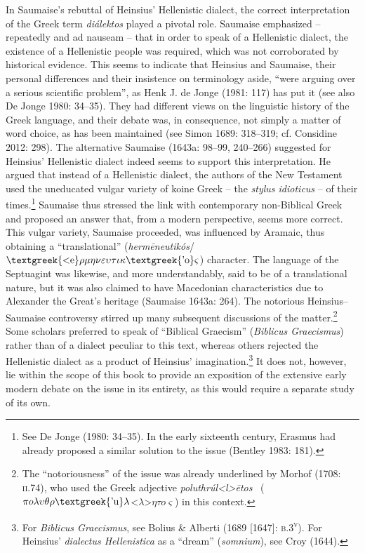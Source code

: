 \begin{styleStandard}
In Saumaise’s rebuttal of Heinsius’ Hellenistic dialect, the correct interpretation of the Greek term \textit{diálektos }played a pivotal role. Saumaise emphasized – repeatedly and ad nauseam – that in order to speak of a Hellenistic dialect, the existence of a Hellenistic people was required, which was not corroborated by historical evidence. This seems to indicate that Heinsius and Saumaise, their personal differences and their insistence on terminology aside, “were arguing over a serious scientific problem”, as Henk J. de Jonge (1981: 117) has put it (see also De Jonge 1980: 34–35). They had different views on the linguistic history of the Greek language, and their debate was, in consequence, not simply a matter of word choice, as has been maintained (see Simon 1689: 318–319; cf. Considine 2012: 298). The alternative Saumaise (1643a: 98–99, 240–266) suggested for Heinsius’ Hellenistic dialect indeed seems to support this interpretation. He argued that instead of a Hellenistic dialect, the authors of the New Testament used the uneducated vulgar variety of koine Greek – the \textit{stylus idioticus} – of their times.\footnote{ See De Jonge (1980: 34–35). In the early sixteenth century, Erasmus had already proposed a similar solution to the issue (Bentley 1983: 181).} Saumaise thus stressed the link with contemporary non-Biblical Greek and proposed an answer that, from a modern perspective, seems more correct. This vulgar variety, Saumaise proceeded, was influenced by Aramaic, thus obtaining a “translational” (\textit{herm\=eneutikós}/$\text{\textgreek{<e}}\rho \mu \eta \nu \varepsilon \upsilon \tau \iota \kappa \text{\textgreek{'o}}\varsigma $) character. The language of the Septuagint was likewise, and more understandably, said to be of a translational nature, but it was also claimed to have Macedonian characteristics due to Alexander the Great’s heritage (Saumaise 1643a: 264). The notorious Heinsius–Saumaise controversy stirred up many subsequent discussions of the matter.\footnote{ The “notoriousness” of the issue was already underlined by Morhof (1708: \textsc{ii.}74), who used the Greek adjective \textit{poluthrúl{\textless}l{\textgreater}\=etos }\ ($\pi o\lambda \upsilon \theta \rho \text{\textgreek{'u}}\lambda ${\textless}$\lambda ${\textgreater}$\eta \tau o\varsigma $) in this context.} Some scholars preferred to speak of “Biblical Graecism” (\textit{Biblicus Graecismus}) rather than of a dialect peculiar to this text, whereas others rejected the Hellenistic dialect as a product of Heinsius’ imagination.\footnote{ For \textit{Biblicus Graecismus}, see Bolius \& Alberti (1689 [1647]: \textsc{b.3}\textsc{\textsuperscript{v}}). For Heinsius’ \textit{dialectus Hellenistica} as a “dream” (\textit{somnium}), see Croy (1644).} It does not, however, lie within the scope of this book to provide an exposition of the extensive early modern debate on the issue in its entirety, as this would require a separate study of its own.
\end{styleStandard}

